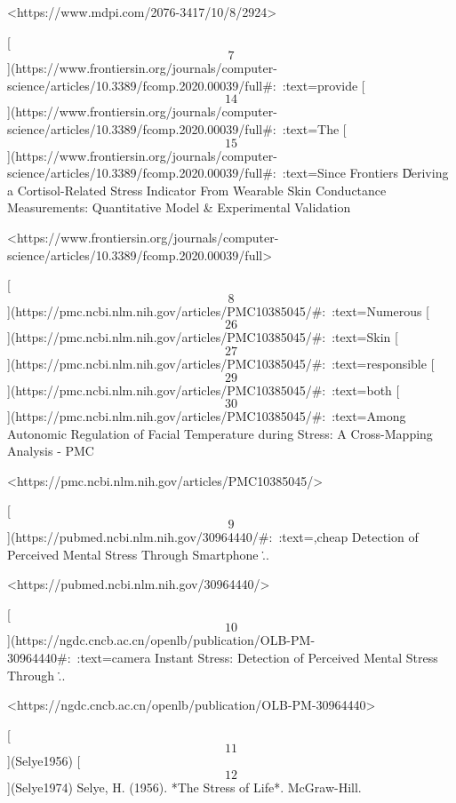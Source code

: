 \documentclass[12pt,a4paper]{article}
\begin{document}
<https://www.mdpi.com/2076-3417/10/8/2924>

[\[7\]](https://www.frontiersin.org/journals/computer-science/articles/10.3389/fcomp.2020.00039/full#:~:text=provide%
[\[14\]](https://www.frontiersin.org/journals/computer-science/articles/10.3389/fcomp.2020.00039/full#:~:text=The%
[\[15\]](https://www.frontiersin.org/journals/computer-science/articles/10.3389/fcomp.2020.00039/full#:~:text=Since%
Frontiers \| Deriving a Cortisol-Related Stress Indicator From Wearable
Skin Conductance Measurements: Quantitative Model & Experimental
Validation

<https://www.frontiersin.org/journals/computer-science/articles/10.3389/fcomp.2020.00039/full>

[\[8\]](https://pmc.ncbi.nlm.nih.gov/articles/PMC10385045/#:~:text=Numerous%
[\[26\]](https://pmc.ncbi.nlm.nih.gov/articles/PMC10385045/#:~:text=Skin%
[\[27\]](https://pmc.ncbi.nlm.nih.gov/articles/PMC10385045/#:~:text=responsible%
[\[29\]](https://pmc.ncbi.nlm.nih.gov/articles/PMC10385045/#:~:text=both%
[\[30\]](https://pmc.ncbi.nlm.nih.gov/articles/PMC10385045/#:~:text=Among%
Autonomic Regulation of Facial Temperature during Stress: A
Cross-Mapping Analysis - PMC

<https://pmc.ncbi.nlm.nih.gov/articles/PMC10385045/>

[\[9\]](https://pubmed.ncbi.nlm.nih.gov/30964440/#:~:text=,cheap%
Detection of Perceived Mental Stress Through Smartphone \...

<https://pubmed.ncbi.nlm.nih.gov/30964440/>

[\[10\]](https://ngdc.cncb.ac.cn/openlb/publication/OLB-PM-30964440#:~:text=camera%
Instant Stress: Detection of Perceived Mental Stress Through \...

<https://ngdc.cncb.ac.cn/openlb/publication/OLB-PM-30964440>

[\[11\]](Selye1956)
[\[12\]](Selye1974)
Selye, H. (1956). *The Stress of Life*. McGraw-Hill.
\end{document}
